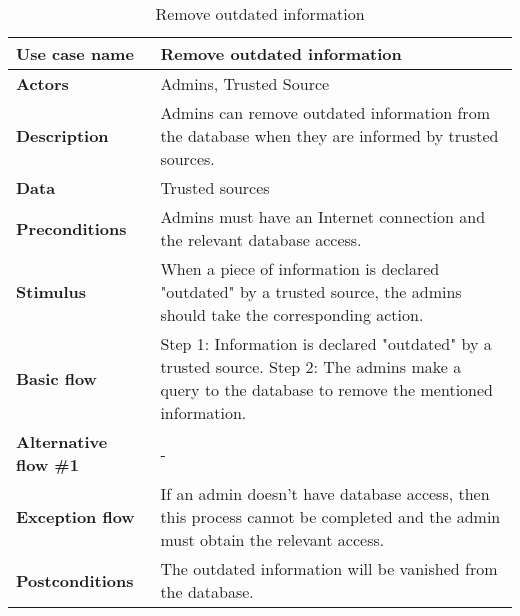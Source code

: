 \documentclass[listof=nochaptergap]{report}
\begin{document}
        \begin{table}[H]
        \centering
         \begin{tabular}{| p{4cm} | p{10cm} |} 
         \hline
         \textbf{Use case name} & Remove outdated information \\
         \hline
         \textbf{Actors} & Admins, Trusted Source \\
         \hline
         \textbf{Description} & Admins can remove outdated information from the database when they are informed by trusted sources.  \\
         \hline
         \textbf{Data} & Trusted sources \\
         \hline
         \textbf{Preconditions} & Admins must have an Internet connection and the relevant database access. \\
         \hline
         \textbf{Stimulus} & When a piece of information is declared "outdated" by a trusted source, the admins should take the corresponding action.  \\
         \hline
         \textbf{Basic flow} & Step 1: Information is declared "outdated" by a trusted source. \newline Step 2: The admins make a query to the database to remove the mentioned information. \\
         \hline
         \textbf{Alternative flow \#1} & - \\
         \hline
         \textbf{Exception flow} & If an admin doesn't have database access, then this process cannot be completed and the admin must obtain the relevant access. \\
         \hline
         \textbf{Postconditions} & The outdated information will be vanished from the database. \\
         \hline
         \end{tabular}
        \caption{Remove outdated information}
        \label{tab:table11}
    \end{table}
\end{document}
